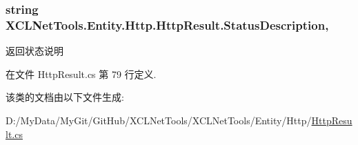 \hypertarget{class_x_c_l_net_tools_1_1_entity_1_1_http_1_1_http_result_ae52de9f66b0248b366ee38cc9eae5659}{
\subsubsection[{Status\-Description}]{\setlength{\rightskip}{0pt plus 5cm}string X\-C\-L\-Net\-Tools.\-Entity.\-Http.\-Http\-Result.\-Status\-Description\hspace{0.3cm}{\ttfamily [get]}, {\ttfamily [set]}}}\label{class_x_c_l_net_tools_1_1_entity_1_1_http_1_1_http_result_ae52de9f66b0248b366ee38cc9eae5659}


返回状态说明 



在文件 Http\-Result.\-cs 第 79 行定义.



该类的文档由以下文件生成\-:\begin{DoxyCompactItemize}
\item 
D\-:/\-My\-Data/\-My\-Git/\-Git\-Hub/\-X\-C\-L\-Net\-Tools/\-X\-C\-L\-Net\-Tools/\-Entity/\-Http/\hyperlink{_http_result_8cs}{Http\-Result.\-cs}\end{DoxyCompactItemize}
